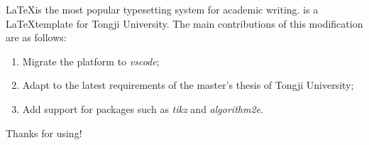 
\begin{eabstract}
  \LaTeX is the most popular typesetting system for academic writing.
  \tongjithesis{} is a \LaTeX template for Tongji University. The main contributions of this modification are as follows:

  \begin{enumerate}[1.]
    \item Migrate the platform to \emph{vscode};
    \item Adapt to the latest requirements of the master's thesis of Tongji University;
    \item Add support for packages such as \emph{tikz} and \emph{algorithm2e}.
  \end{enumerate}

  Thanks for using!
\end{eabstract}

